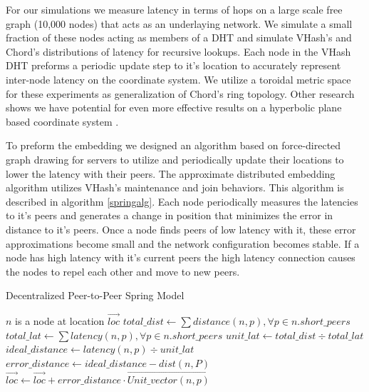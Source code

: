 \documentclass{IEEEtran}
\begin{document}
For our simulations we measure latency in terms of hops on a large scale free graph (10,000 nodes) that acts as an underlaying network.
We simulate a small fraction of these nodes acting as members of a DHT and simulate VHash's and Chord's distributions of latency for recursive lookups.
Each node in the VHash DHT preforms a periodic update step to it's location to accurately represent inter-node latency on the coordinate system.
We utilize a toroidal metric space for these experiments as generalization of Chord's ring topology.
Other research shows we have potential for even more effective results on a hyperbolic plane  based coordinate system \cite{papadopoulos2010greedy}.

To preform the embedding we designed an algorithm based on force-directed graph drawing \cite{Spring} for servers to utilize and periodically update their locations to lower the latency with their peers.
The approximate distributed embedding algorithm utilizes VHash's maintenance and join behaviors.
This algorithm is described in algorithm \ref{springalg}. Each node periodically measures the latencies to it's peers and generates a change in position that minimizes the error in distance to it's peers.
Once a node finds peers of low latency with it, these error approximations become small and the network configuration becomes stable.
If a node has high latency with it's current peers the high latency connection causes the nodes to repel each other and move to new peers.

\begin{algorithm}
\caption{Decentralized Peer-to-Peer Spring Model}
\label{springalg}
\begin{algorithmic}[1] 
	\STATE $n$ is a node at location $\overrightarrow{loc}$
    \STATE $total\_dist \leftarrow \sum distance(n,p),\forall p \in n.short\_peers$
    \STATE $total\_lat \leftarrow \sum latency(n,p),\forall p \in n.short\_peers$
    \STATE $unit\_lat \leftarrow total\_dist \div total\_lat$
    	\STATE $ideal\_distance \leftarrow latency(n,p) \div unit\_lat$
        \STATE $error\_distance \leftarrow ideal\_distance - dist(n,P)$
        \STATE $\overrightarrow{loc} \leftarrow \overrightarrow{loc} + error\_distance \cdot \overrightarrow{Unit\_vector(n,p)} $
    \ENDFOR
\end{algorithmic}
\end{algorithm}
\end{document}
